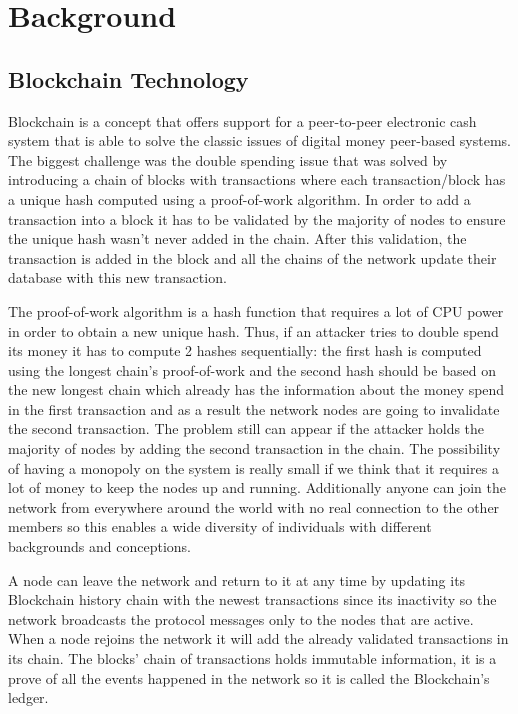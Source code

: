 \chapter{Background}
\label{chapter:chapter1}

\section{Blockchain Technology}
\label{sec:chapter1-section1}

Blockchain is a concept that offers support for a peer-to-peer electronic cash system that is able to solve the classic issues of digital money peer-based systems. The biggest challenge was the double spending issue that was solved by introducing a chain of blocks with transactions where each transaction/block has a unique hash computed using a proof-of-work algorithm. In order to add a transaction into a block it has to be validated by the majority of nodes to ensure the unique hash wasn't never added in the chain. After this validation, the transaction is added in the block and all the chains of the network update their database with this new transaction. 

The proof-of-work algorithm is a hash function that requires a lot of CPU power in order to obtain a new unique hash. Thus, if an attacker tries to double spend its money it has to compute 2 hashes sequentially: the first hash is computed using the longest chain's proof-of-work and the second hash should be based on the new longest chain which already has the information about the money spend in the first transaction and as a result the network nodes are going to invalidate the second transaction. The problem still can appear if the attacker holds the majority of nodes by adding the second transaction in the chain. The possibility of having a monopoly on the system is really small if we think that it requires a lot of money to keep the nodes up and running. Additionally anyone can join the network from everywhere around the world with no real connection to the other members so this enables a wide diversity of individuals with different backgrounds and conceptions.

A node can leave the network and return to it at any time by updating its Blockchain history chain with the newest transactions since its inactivity so the network broadcasts the protocol messages only to the nodes that are active. When a node rejoins the network it will add the already validated transactions in its chain. The blocks' chain of transactions holds immutable information, it is a prove of all the events happened in the network so it is called the Blockchain's ledger.

